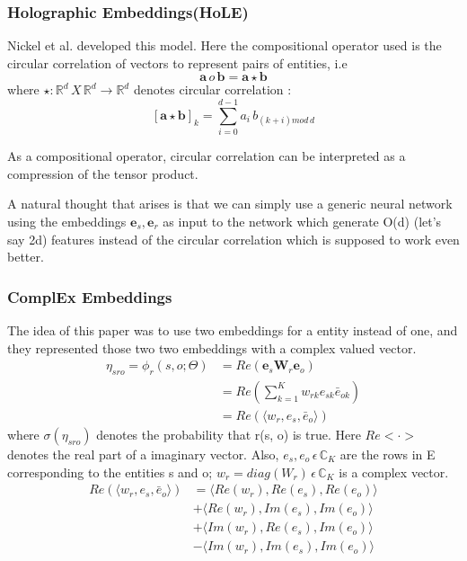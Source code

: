 \documentclass[12pt]{article}
\newcommand{\R}{\mathbb{R}}
\begin{document}
\subsubsection{Holographic Embeddings(HoLE)}
Nickel et al.\cite{DBLP:journals/corr/NickelRP15} developed this model. Here the compositional operator used is the  circular correlation of vectors to represent pairs of entities, i.e 
$$ \textbf{a} \,o\, \textbf{b} = \textbf{a} \star \textbf{b} $$
where $ \star : \R^d \,X\, \R^d \rightarrow \R^d $ denotes circular correlation\cite{} :
$$ [\textbf{a} \star \textbf{b}]_k = \sum_{i=0}^{d-1} a_i\, b_{(k+i)mod\,d} $$

As a compositional operator, circular correlation can be
interpreted as a compression of the tensor product.

\label{neural}
A natural thought that arises is that we can simply use a generic neural network using the embeddings $\textbf{e}_s, \textbf{e}_r$ as input to the network which generate O(d) (let's say 2d) features  instead of the circular correlation which is supposed to work even better.

\subsubsection{ComplEx Embeddings}
The idea of this paper\cite{DBLP:journals/corr/TrouillonWRGB16} was to use two embeddings for a entity instead of one, and they represented those two two embeddings with a complex valued vector. 
\begin{align*}
\eta_{sro} = \phi_r(s, o; \Theta) &= Re(\textbf{e}_s \textbf{W}_r \textbf{e}_o)\\
 &= Re(\sum^{K}_{k=1}w_{rk}e_{sk}\bar{e}_{ok})\\
 &= Re(\langle w_r , e_s, \bar{e}_o  \rangle )
\end{align*}
where $\sigma(\eta_{sro})$ denotes the probability that r(s, o) is true.
Here $Re<\cdot>$ denotes the real part of a imaginary vector. Also,  $e_s, e_o\, \epsilon \, \mathbb{C}_K$
are the rows in E corresponding to the entities s and o; $w_r = diag(W_r) \, \epsilon \, \mathbb{C}_K$ is a complex vector.
\begin{align*}
Re(\langle w_r , e_s, \bar{e}_o  \rangle ) &= \langle Re(w_r), Re(e_s), Re(e_o) \rangle \\
&+ \langle Re(w_r), Im(e_s), Im(e_o) \rangle \\
&+ \langle Im(w_r), Re(e_s), Im(e_o) \rangle \\
&- \langle Im(w_r), Im(e_s), Im(e_o) \rangle \\
\end{align*}
\end{document}

